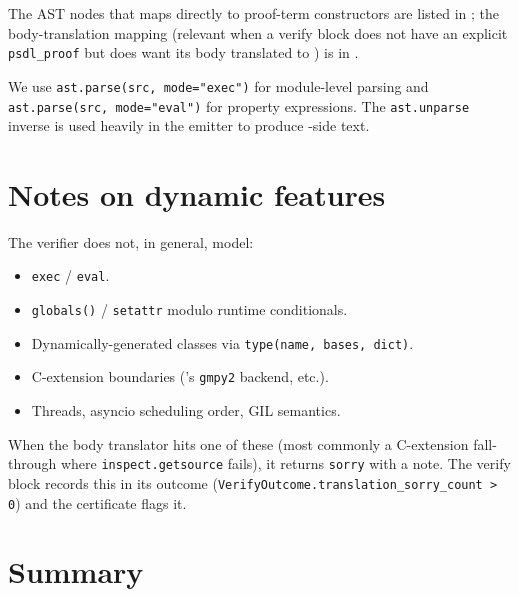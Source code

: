 The AST nodes that \PSDL{} maps directly to proof-term
constructors are listed in ; the body-translation
mapping (relevant when a verify block does not have an explicit
\verb|psdl_proof| but does want its body translated to \Lean{}) is
in .

We use \verb|ast.parse(src, mode="exec")| for module-level
parsing and \verb|ast.parse(src, mode="eval")| for property
expressions.  The \verb|ast.unparse| inverse is used heavily in the
emitter to produce \Lean{}-side text.

\section{Notes on dynamic features}
\label{sec:dynamic}

The verifier does not, in general, model:

\begin{itemize}[leftmargin=1.7em]
  \item \verb|exec| / \verb|eval|.
  \item \verb|globals()| / \verb|setattr| modulo runtime conditionals.
  \item Dynamically-generated classes via \verb|type(name, bases, dict)|.
  \item C-extension boundaries (\Sympy{}'s \verb|gmpy2| backend, etc.).
  \item Threads, asyncio scheduling order, GIL semantics.
\end{itemize}

When the body translator hits one of these (most commonly a
C-extension fall-through where \verb|inspect.getsource| fails), it
returns \verb|sorry| with a note.  The verify block records this in
its outcome (\verb|VerifyOutcome.translation_sorry_count > 0|) and
the certificate flags it.

\section{Summary}
\label{sec:ch3-summary}


